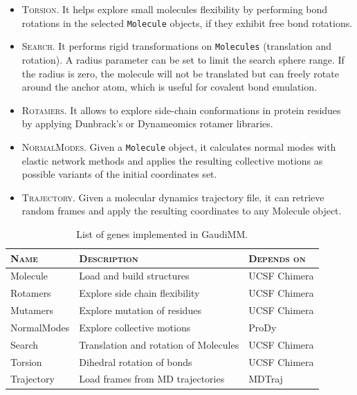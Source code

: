 \begin{itemize}
	\item \textsc{Torsion}. It helps explore small molecules flexibility by performing bond rotations in the selected \texttt{Molecule} objects, if they exhibit free bond rotations.

	\item \textsc{Search}. It performs rigid transformations on \texttt{Molecules} (translation and rotation). A radius parameter can be set to limit the search sphere range. If the radius is zero, the molecule will not be translated but can freely rotate around the anchor atom, which is useful for covalent bond emulation.

	\item \textsc{Rotamers}. It allows to explore side-chain conformations in protein residues by applying Dunbrack’s\cite{dunbrack1993backbone} or Dynameomics\cite{scouras2011dynameomics} rotamer libraries.

	\item \textsc{NormalModes}. Given a \texttt{Molecule} object, it calculates normal modes with elastic network methods and applies the resulting collective motions as possible variants of the initial coordinates set.

	\item \textsc{Trajectory}. Given a molecular dynamics trajectory file, it can retrieve random frames and apply the resulting coordinates to any Molecule object.
\end{itemize}


\begin{table}[hbtp]
	\caption[List of genes implemented in GaudiMM]{List of genes implemented in GaudiMM.}
	\label{table:gaudi-genes}
\footnotesize
{}%
%
%
\begin{tabularx}{\textwidth}{LMR}
\toprule
\textsc{Name} & \textsc{Description} & \textsc{Depends on} \\
\toprule
 Molecule & Load and build structures & UCSF Chimera \\
\hhline{~~~}
 Rotamers & Explore side chain flexibility & UCSF Chimera \\
\hhline{~~~}
 Mutamers & Explore mutation of residues & UCSF Chimera \\
\hhline{~~~}
 NormalModes & Explore collective motions & ProDy\cite{prody} \\
\hhline{~~~}
 Search & Translation and rotation of Molecules & UCSF Chimera \\
\hhline{~~~}
 Torsion & Dihedral rotation of bonds & UCSF Chimera \\
\hhline{~~~}
 Trajectory & Load frames from MD trajectories & MDTraj\cite{mdtraj} \\
\bottomrule
\end{tabularx}
\end{table}


